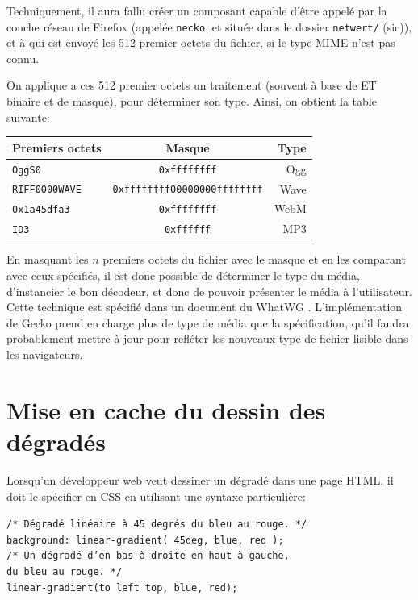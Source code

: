 \documentclass[a4paper,10pt]{article}
\newcommand{\cc}[1]{\texttt{#1}}
\begin{document}
\begin{multicols}{2}
    Techniquement, il aura fallu créer un composant capable d'être appelé par
    la couche réseau de Firefox (appelée \cc{necko}, et située dans le dossier
    \cc{netwert/} (sic)), et à qui est envoyé les 512 premier octets du fichier,
    si le type MIME n'est pas connu.

    On applique a ces 512 premier octets un traitement  (souvent à base de ET
    binaire et de masque), pour déterminer son type. Ainsi, on obtient la table
    suivante:

    \begin{center}
      \begin{tabular}{l | c | r }%
        Premiers octets & Masque                          & Type \\ \hline
             \cc{OggS0} & \cc{0xffffffff}                 & Ogg  \\
      \cc{RIFF0000WAVE} & \cc{0xffffffff00000000ffffffff} & Wave \\
        \cc{0x1a45dfa3} & \cc{0xffffffff}                 & WebM \\
               \cc{ID3} & \cc{0xffffff}                   & MP3
      \end{tabular}
    \end{center}

    En masquant les $n$ premiers octets du fichier avec le masque et en les
    comparant avec ceux spécifiés, il est donc possible de déterminer le type du
    média, d'instancier le bon décodeur, et donc de pouvoir présenter le média à
    l'utilisateur. Cette technique est spécifié dans un document du WhatWG
    \cite{Sniff}. L'implémentation de Gecko prend en charge plus de type de
    média que la spécification, qu'il faudra probablement mettre à jour pour
    refléter les nouveaux type de fichier lisible dans les navigateurs.

  \section{Mise en cache du dessin des dégradés}

  Lorsqu'un développeur web veut dessiner un dégradé dans une page HTML, il doit
  le spécifier en CSS en utilisant une syntaxe particulière:

    \noindent
  {\footnotesize
  \cc{/* Dégradé linéaire à 45 degrés du bleu au rouge. */\\
    background: linear-gradient( 45deg, blue, red );\\
    /* Un dégradé d'en bas à droite en haut à gauche,\\
       du bleu au rouge. */\\
    linear-gradient(to left top, blue, red);\\
  }}


\end{multicols}
\end{document}
